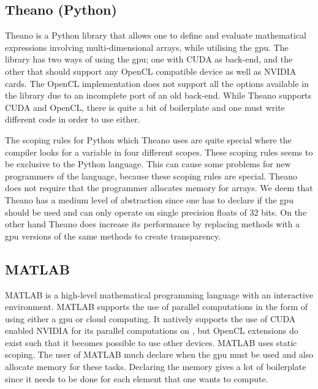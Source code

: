\subsection{Theano (Python)}
Theano is a Python library that allows one to define and evaluate mathematical expressions involving multi-dimensional arrays, while utilising the \acrshort{gpu}.
The library has two ways of using the \acrshort{gpu}; one with CUDA as back-end, and the other that should support any OpenCL compatible device as well as NVIDIA cards.
The OpenCL implementation does not support all the options available in the library due to an incomplete port of an old back-end.
While Theano supports CUDA and OpenCL, there is quite a bit of boilerplate and one must write different code in order to use either.

The scoping rules for Python which Theano uses are quite special where the compiler looks for a variable in four different scopes.
These scoping rules seems to be exclusive to the Python language. 
This can cause some problems for new programmers of the language, because these scoping rules are special. 
Theano does not require that the programmer allocates memory for arrays.
We deem that Theano has a medium level of abstraction since one has to declare if the \acrshort{gpu} should be used and can only operate on single precision floats of 32 bits.
On the other hand Theano does increase its performance by replacing methods with a \acrshort{gpu} versions of the same methods to create transparency. \citep{Theano,Theano_GPU,bergstratheano, LEGB}

\subsection{MATLAB}
MATLAB is a high-level mathematical programming language with an interactive environment.
MATLAB supports the use of parallel computations in the form of using either a \acrshort{gpu} or cloud computing.
It natively supports the use of CUDA enabled NVIDIA  for its parallel computations on , but OpenCL extensions do exist such that it becomes possible to use other devices.
MATLAB uses static scoping. 
The user of MATLAB much declare when the \acrshort{gpu} must be used and also allocate memory for these tasks.
Declaring the memory gives a lot of boilerplate since it needs to be done for each element that one wants to compute. \citep{MATLAB_backend,MATLAB_benchmark}

